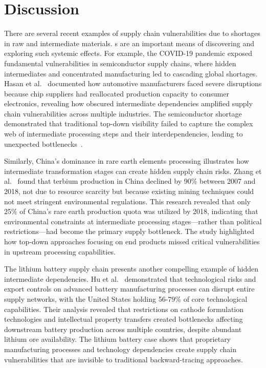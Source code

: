 \section{Discussion}
\label{sec:discussion}

There are several recent examples of supply chain vulnerabilities due to shortages in raw and intermediate materials. \tool{}s
are an important means of discovering and exploring such systemic effects.
For example, the COVID-19 pandemic exposed fundamental vulnerabilities in semiconductor supply chains, where hidden intermediates and concentrated manufacturing led to cascading global shortages. Hasan et al.~\cite{hasan2022demand} documented how automotive manufacturers faced severe disruptions because chip suppliers had reallocated production capacity to consumer electronics, revealing how obscured intermediate dependencies amplified supply chain vulnerabilities across multiple industries. The semiconductor shortage demonstrated that traditional top-down visibility failed to capture the complex web of intermediate processing steps and their interdependencies, leading to unexpected bottlenecks~\cite{chakraborty2022empirical,tam2022understanding}.

Similarly, China's dominance in rare earth elements processing illustrates how intermediate transformation stages can create hidden supply chain risks. Zhang et al.~\cite{zhang2024reshaping} found that terbium production in China declined by 90\% between 2007 and 2018, not due to resource scarcity but because existing mining techniques could not meet stringent environmental regulations. This research revealed that only 25\% of China's rare earth production quota was utilized by 2018, indicating that environmental constraints at intermediate processing stages—rather than political restrictions—had become the primary supply bottleneck. The study highlighted how top-down approaches focusing on end products missed critical vulnerabilities in upstream processing capabilities.

The lithium battery supply chain presents another compelling example of hidden intermediate dependencies. Hu et al.~\cite{hu2025technological} demonstrated that technological risks and export controls on advanced battery manufacturing processes can disrupt entire supply networks, with the United States holding 56-79\% of core technological capabilities. Their analysis revealed that restrictions on cathode formulation technologies and intellectual property transfers created bottlenecks affecting downstream battery production across multiple countries, despite abundant lithium ore availability. The lithium battery case shows that proprietary manufacturing processes and technology dependencies create supply chain vulnerabilities that are invisible to traditional backward-tracing approaches.

